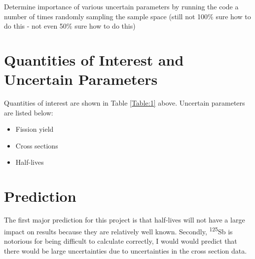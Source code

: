 \documentclass[11pt,notitlepage]{article}
\newcommand{\tss}{\textsuperscript}
\begin{document}
\begin{todolist}

  
\item{Determine importance of various uncertain parameters
  by running the code a number of times randomly sampling
  the sample space (still not 100\% sure how to do this -
  not even 50\% sure how to do this)}
\end{todolist}



\section{Quantities of Interest and Uncertain Parameters}

Quantities of interest are shown in Table \ref{Table:1} above.
Uncertain parameters are listed below:

\begin{itemize}
\item{Fission yield}
\item{Cross sections}
\item{Half-lives}
\end{itemize}


\section{Prediction}

The first major prediction for this project is that half-lives
will not have a large impact on results because they are
relatively well known. Secondly, \tss{125}Sb is notorious
for being difficult to calculate correctly, I would would predict that
there would be large uncertainties due to uncertainties in
the cross section data.



\end{document}
